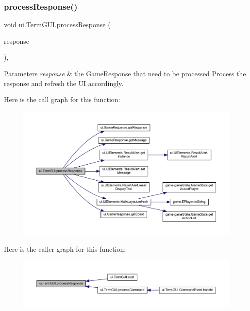 \subsubsection{\texorpdfstring{process\+Response()}{processResponse()}}
{\footnotesize\ttfamily void ui.\+Term\+G\+U\+I.\+process\+Response (\begin{DoxyParamCaption}\item[{\mbox{\hyperlink{classui_1_1_game_response}{Game\+Response}}}]{response }\end{DoxyParamCaption})\hspace{0.3cm}{\ttfamily [inline]}, {\ttfamily [private]}}


\begin{DoxyParams}{Parameters}
{\em response} & the \mbox{\hyperlink{classui_1_1_game_response}{Game\+Response}} that need to be processed Process the response and refresh the UI accordingly. \\
\hline
\end{DoxyParams}
Here is the call graph for this function\+:
\nopagebreak
\begin{figure}[H]
\begin{center}
\leavevmode
\includegraphics[width=350pt]{classui_1_1_term_g_u_i_aa1c37916b26b5ecb5e98a88621cb03c1_cgraph}
\end{center}
\end{figure}
Here is the caller graph for this function\+:
\nopagebreak
\begin{figure}[H]
\begin{center}
\leavevmode
\includegraphics[width=350pt]{classui_1_1_term_g_u_i_aa1c37916b26b5ecb5e98a88621cb03c1_icgraph}
\end{center}
\end{figure}
\mbox{\label{classui_1_1_term_g_u_i_a46859d29835a7053b48e49f27b377f76}} 
